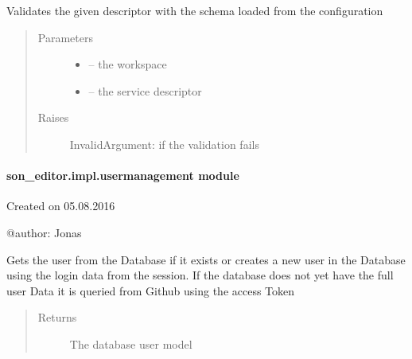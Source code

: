 \documentclass[letterpaper,10pt,english]{sphinxmanual}
\begin{document}
\begin{fulllineitems}
\label{_source/son_editor.impl:son_editor.impl.servicesimpl.validate_service_descriptor}
Validates the given descriptor with the schema loaded from the configuration
\begin{quote}\begin{description}
\item[{Parameters}] \leavevmode\begin{itemize}
\item {} 
 -- the workspace

\item {} 
 -- the service descriptor

\end{itemize}

\item[{Raises}] \leavevmode
InvalidArgument: if the validation fails

\end{description}\end{quote}

\end{fulllineitems}



\paragraph{son\_editor.impl.usermanagement module}
\label{_source/son_editor.impl:module-son_editor.impl.usermanagement}\label{_source/son_editor.impl:son-editor-impl-usermanagement-module}
Created on 05.08.2016

@author: Jonas

\begin{fulllineitems}
\label{_source/son_editor.impl:son_editor.impl.usermanagement.get_user}
Gets the user from the Database if it exists or
creates a new user in the Database using the
login data from the session. If the database does
not yet have the full user Data it is queried
from Github using the access Token
\begin{quote}\begin{description}
\item[{Returns}] \leavevmode
The database user model

\end{description}\end{quote}

\end{fulllineitems}
\end{document}
